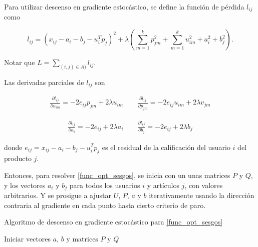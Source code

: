 Para utilizar descenso en gradiente estocástico, se define la función de pérdida $l_{ij}$ como

\[
l_{ij} = \left( x_{ij} - a_i - b_j - u_i^T p_j \right) ^2
+ \lambda \left( 
\sum_{m = 1}^{k}p_{jm}^2 + 
\sum_{m = 1}^{k}u_{im}^2 + 
a_i^2 + 
b_j^2 \right) .
\]

Notar que $L = \sum_{(i,j) \in A)} l_{ij}$.

Las derivadas parciales de $l_{ij}$ son

\[
\begin{split}
\frac{\partial l_{ij}}{\partial u_{im}} = -2 e_{ij} p_{jm} + 2 \lambda u_{im} 
\qquad
\frac{\partial l_{ij}}{\partial p_{jm}} = -2 e_{ij} u_{im} + 2 \lambda v_{jm}
\end{split}
\]

\[
\begin{split}
\frac{\partial l_{ij}}{\partial a_i} = -2 e_{ij} + 2 \lambda a_i 
\qquad
\frac{\partial l_{ij}}{\partial b_j} = -2 e_{ij} + 2 \lambda b_j
\end{split}
\]

donde $e_{ij} =  x_{ij} - a_i - b_j - u_i^T p_j$ es el residual de la calificación del usuario $i$ del producto $j$.

Entonces, para resolver \ref{func_opt_sesgos}, se inicia con un unas matrices $P$ y $Q$, y los vectores $a_i$ y $b_j$ para todos los usuarios $i$ y artículos $j$, con valores arbitrarios. Y se prosigue a ajustar $U$, $P$, $a$ y $b$ iterativamente usando la dirección contraria al gradiente en cada punto hasta cierto criterio de paro.

\begin{algorithm}[ht]
 \caption{Algoritmo de descenso en gradiente estocástico para \ref{func_opt_sesgos}}
    \SetAlgoLined
    Iniciar vectores $a$, $b$ y matrices $P$ y $Q$\\
\end{algorithm}

